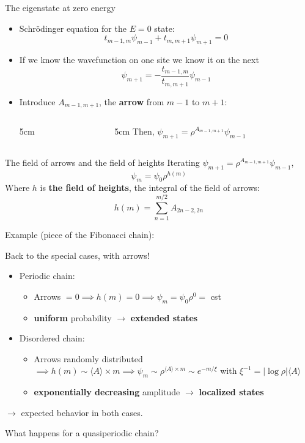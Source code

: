 \documentclass[xcolor=x11names,compress,professionalfonts, aspectratio=169]{beamer}
\renewcommand{\(}{\begin{columns}}
\renewcommand{\)}{\end{columns}}
\newcommand{\<}[1]{\begin{column}{#1}}
\renewcommand{\>}{\end{column}}
\begin{document}
\begin{frame}{The eigenstate at zero energy}
\begin{itemize}
	\item Schrödinger equation for the $E=0$ state:
	\[
	t_{m-1,m} \psi_{m-1} + t_{m,m+1}\psi_{m+1} = 0
	\]
	\item If we know the wavefunction on one site we know it on the next
	\[
	\psi_{m+1} = -\frac{t_{m-1,m}}{t_{m,m+1}} \psi_{m-1}
	\]
%	
%	 
	\item Introduce $A_{m-1,m+1}$, the \textbf{arrow} from $m-1$ to $m+1$:
	\begin{columns}
	\<{5cm}
	\centering
	 
	 \>
	 \<{5cm}
	Then, $\boxed{\psi_{m+1} = \rho^{A_{m-1,m+1}} \psi_{m-1}}$
	 \>
	 \end{columns}
\end{itemize}
\end{frame}

\begin{frame}{The field of arrows and the field of heights}
Iterating $\psi_{m+1} = \rho^{A_{m-1,m+1}} \psi_{m-1}$,
\[
	\psi_{m} = \psi_0 \rho^{h(m)}
\]
Where $h$ is \textbf{the field of heights}, the integral of the field of arrows:
\[
	h(m) = \sum_{n=1}^{m/2} A_{2n-2, 2n}
\]

Example (piece of the Fibonacci chain):



\end{frame}

\begin{frame}{Back to the special cases, with arrows!}
\begin{itemize}
	\item Periodic chain: 
	
	\begin{itemize}
		\item Arrows $= 0 \implies h(m) = 0 \implies \psi_m = \psi_0 \rho^{0} = $ cst  
		\item \textbf{uniform} probability $\rightarrow$ \textbf{extended states}
	\end{itemize}
	\item Disordered chain: 
	
	\begin{itemize}
		\item Arrows randomly distributed $\implies h(m) \sim \langle A \rangle \times m \implies \psi_m \sim \rho^{\langle A \rangle \times m} \sim e^{- m/\xi}$ with $\xi^{-1} = |\log \rho| \langle A \rangle$
		\item  \textbf{exponentially decreasing} amplitude $\rightarrow$ \textbf{localized states}
	\end{itemize}
\end{itemize}
$\rightarrow$ expected behavior in both cases.

What happens for a quasiperiodic chain?
\end{frame}
\end{document}

